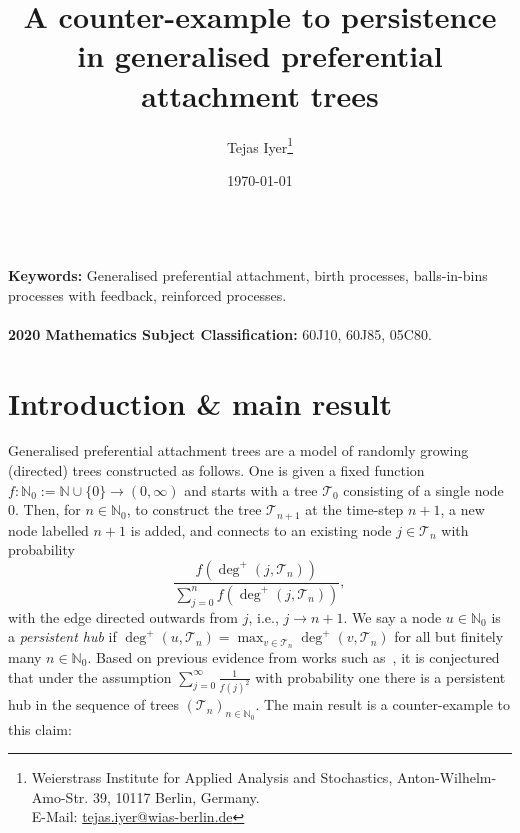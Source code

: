 \documentclass[12pt]{article}
\title{A counter-example to persistence in generalised preferential attachment trees}
\author{Tejas Iyer\footnote{Weierstrass Institute for Applied Analysis and Stochastics, Anton-Wilhelm-Amo-Str. 39, 10117 Berlin, Germany. \\ E-Mail: \href{mailto:tejas.iyer@wias-berlin.de}{tejas.iyer@wias-berlin.de} }}
\date{\today}
\theoremstyle{definition}
\DeclareMathOperator{\degg}{deg}
\newcommand{\outdeg}[1]{\ensuremath{\degg^{+}(#1)}}
\begin{document}
\maketitle
{}
\noindent  \bigskip
\\
{\bf Keywords:} Generalised preferential attachment, birth processes, balls-in-bins processes with feedback, reinforced processes. 
\\\\
{\bf 2020 Mathematics Subject Classification:} 60J10, 60J85, 05C80. 

\section{Introduction \& main result}

Generalised preferential attachment trees are a model of randomly growing (directed) trees constructed as follows. One is given a fixed function $f\colon \mathbb{N}_0 :=\mathbb{N} \cup \{0\} \rightarrow (0, \infty)$ and starts with a tree $\mathcal{T}_0$ consisting of a single node $0$. Then, for $n \in \mathbb{N}_0$, to construct the tree $\mathcal{T}_{n+1}$ at the time-step $n+1$, a new node labelled $n+1$ is added, and connects to an existing node $j \in \mathcal{T}_n$ with probability 
\[
\frac{f(\deg^{+}(j, \mathcal{T}_{n}))}{\sum_{j=0}^{n} f(\deg^{+}(j, \mathcal{T}_{n}))},  
\]
with the edge directed outwards from $j$, i.e., $j \rightarrow n+1$. We say a node $u \in \mathbb{N}_0$ is a \emph{persistent hub} if $\outdeg{u, \mathcal{T}_{n}} = \max_{v \in \mathcal{T}_{n}} \outdeg{v, \mathcal{T}_{n}}$ for all but finitely many $n \in \mathbb{N}_0$. Based on previous evidence from works such as~\cite{dereich-morters-persistence, banerjee-bhamidi, galashin}, it is conjectured~\cite[Remark~2.11.]{iyer2024persistenthubscmjbranching} that under the assumption $\sum_{j=0}^{\infty} \frac{1}{f(j)^2}$ with probability one there is a persistent hub in the sequence of trees $(\mathcal{T}_{n})_{n \in \mathbb{N}_0}$. The main result is a counter-example to this claim:
\end{document}
